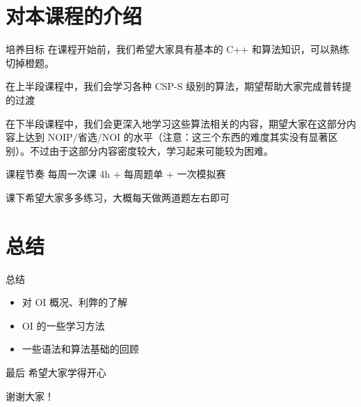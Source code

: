\documentclass[11pt,aspectratio=169]{beamer}
\begin{document}
\section{对本课程的介绍}
\begin{frame}{培养目标}
    在课程开始前，我们希望大家具有基本的 C++ 和算法知识，可以熟练切掉橙题。

    在上半段课程中，我们会学习各种 CSP-S 级别的算法，期望帮助大家完成普转提的过渡

    在下半段课程中，我们会更深入地学习这些算法相关的内容，期望大家在这部分内容上达到 NOIP/省选/NOI 的水平（注意：这三个东西的难度其实没有显著区别）。不过由于这部分内容密度较大，学习起来可能较为困难。
\end{frame}

\begin{frame}{课程节奏}
    每周一次课 4h + 每周题单 + 一次模拟赛

    课下希望大家多多练习，大概每天做两道题左右即可
\end{frame}
\section{总结}

\begin{frame}{总结}
\begin{itemize}
    \item 对 OI 概况、利弊的了解
    \item OI 的一些学习方法
    \item 一些语法和算法基础的回顾
\end{itemize}
\end{frame}

\begin{frame}{最后}
希望大家学得开心

\pause
\centerline{\Large 谢谢大家！}
\end{frame}
\end{document}
